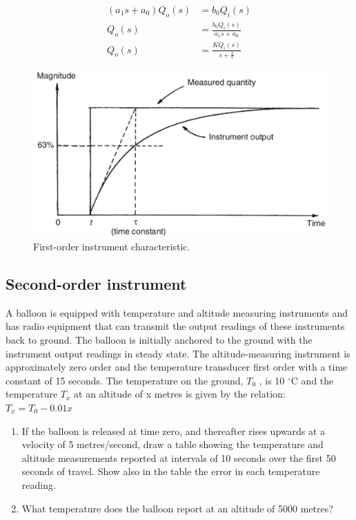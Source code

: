 \documentclass[a4paper,11pt]{book}
\begin{document}
\begin{align}
( a_1 s + a_0 ) Q_o(s) &= b_0 Q_i(s)  \\
Q_o(s) &= \frac{ b_0 Q_i(s) }{ a_1 s + a_0 } \\
Q_o(s) &= \frac{ K Q_i(s) }{ s + \frac{1}{\uptau}} \label{eqn:first-order-laplace}
\end{align}

\begin{figure}[h!]\label{fig:first-order}
\centering
  \includegraphics[width=0.7\linewidth]{first-order}
  \caption{First-order instrument characteristic.} 
\end{figure}

\subsection*{Second-order instrument}


\begin{question}
A balloon is equipped with temperature and altitude measuring instruments and has radio
equipment that can transmit the output readings of these instruments back to ground. The
balloon is initially anchored to the ground with the instrument output readings in steady state.
The altitude-measuring instrument is approximately zero order and the temperature transducer
first order with a time constant of 15 seconds. The temperature on the ground, $T_0$ , is 10 $^{\circ}$C and the temperature $T_x$  at an altitude of x metres is
given by the relation: \\
$T_x = T_0 − 0.01x$

\begin{enumerate}
\item If the balloon is released at time zero, and thereafter rises upwards at a velocity of 5 metres/second, draw a table showing the temperature and altitude measurements reported
at intervals of 10 seconds over the first 50 seconds of travel. Show also in the table the
error in each temperature reading.
\item  What temperature does the balloon report at an altitude of 5000 metres?
\end{enumerate}

\examspace*{5em}

\end{question}
\begin{solution}


\end{solution}
\end{document}
